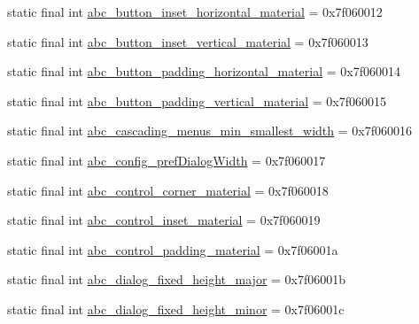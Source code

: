 \begin{DoxyCompactItemize}
static final int \mbox{\hyperlink{classandroid_1_1support_1_1v7_1_1appcompat_1_1R_1_1dimen_ac53d3135eb3d115bf3286735276dd240}{abc\+\_\+button\+\_\+inset\+\_\+horizontal\+\_\+material}} = 0x7f060012
\item 
static final int \mbox{\hyperlink{classandroid_1_1support_1_1v7_1_1appcompat_1_1R_1_1dimen_a6536a246e0a31fd4ba7f4181e955dabe}{abc\+\_\+button\+\_\+inset\+\_\+vertical\+\_\+material}} = 0x7f060013
\item 
static final int \mbox{\hyperlink{classandroid_1_1support_1_1v7_1_1appcompat_1_1R_1_1dimen_aa2efa92063f2ff2083d5ed60dcd38692}{abc\+\_\+button\+\_\+padding\+\_\+horizontal\+\_\+material}} = 0x7f060014
\item 
static final int \mbox{\hyperlink{classandroid_1_1support_1_1v7_1_1appcompat_1_1R_1_1dimen_aff8aac206e359494fadb9f6730581fe2}{abc\+\_\+button\+\_\+padding\+\_\+vertical\+\_\+material}} = 0x7f060015
\item 
static final int \mbox{\hyperlink{classandroid_1_1support_1_1v7_1_1appcompat_1_1R_1_1dimen_a9dd9e68e0c12d3c75864e9be2de44a7a}{abc\+\_\+cascading\+\_\+menus\+\_\+min\+\_\+smallest\+\_\+width}} = 0x7f060016
\item 
static final int \mbox{\hyperlink{classandroid_1_1support_1_1v7_1_1appcompat_1_1R_1_1dimen_a2977b61339311ee48206b57404b7d61d}{abc\+\_\+config\+\_\+pref\+Dialog\+Width}} = 0x7f060017
\item 
static final int \mbox{\hyperlink{classandroid_1_1support_1_1v7_1_1appcompat_1_1R_1_1dimen_a13f81d258daed6e1dcadc20a7aa5bc23}{abc\+\_\+control\+\_\+corner\+\_\+material}} = 0x7f060018
\item 
static final int \mbox{\hyperlink{classandroid_1_1support_1_1v7_1_1appcompat_1_1R_1_1dimen_a65e3e7e15aaf39699c9b1817f971c427}{abc\+\_\+control\+\_\+inset\+\_\+material}} = 0x7f060019
\item 
static final int \mbox{\hyperlink{classandroid_1_1support_1_1v7_1_1appcompat_1_1R_1_1dimen_ae9d833d10a6a830c2469c672675f9e19}{abc\+\_\+control\+\_\+padding\+\_\+material}} = 0x7f06001a
\item 
static final int \mbox{\hyperlink{classandroid_1_1support_1_1v7_1_1appcompat_1_1R_1_1dimen_a80371870c7a9ca3b13f51eba5501c521}{abc\+\_\+dialog\+\_\+fixed\+\_\+height\+\_\+major}} = 0x7f06001b
\item 
static final int \mbox{\hyperlink{classandroid_1_1support_1_1v7_1_1appcompat_1_1R_1_1dimen_a415efc1c1c01dc944b8b147483840fad}{abc\+\_\+dialog\+\_\+fixed\+\_\+height\+\_\+minor}} = 0x7f06001c
\item 

\end{DoxyCompactItemize}
